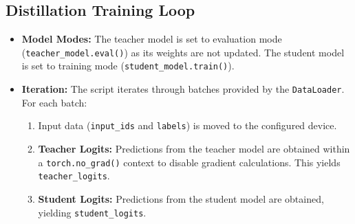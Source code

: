 \documentclass{article}
\begin{document}
\subsection{Distillation Training Loop}
\begin{itemize}
    \item \textbf{Model Modes:} The teacher model is set to evaluation mode (\texttt{teacher\_model.eval()}) as its weights are not updated. The student model is set to training mode (\texttt{student\_model.train()}).
    \item \textbf{Iteration:} The script iterates through batches provided by the \texttt{DataLoader}. For each batch:
        \begin{enumerate}
            \item Input data (\texttt{input\_ids} and \texttt{labels}) is moved to the configured device.
            \item \textbf{Teacher Logits:} Predictions from the teacher model are obtained within a \texttt{torch.no\_grad()} context to disable gradient calculations. This yields \texttt{teacher\_logits}.
            \item \textbf{Student Logits:} Predictions from the student model are obtained, yielding \texttt{student\_logits}.
        \end{enumerate}
\end{itemize}
\end{document}
